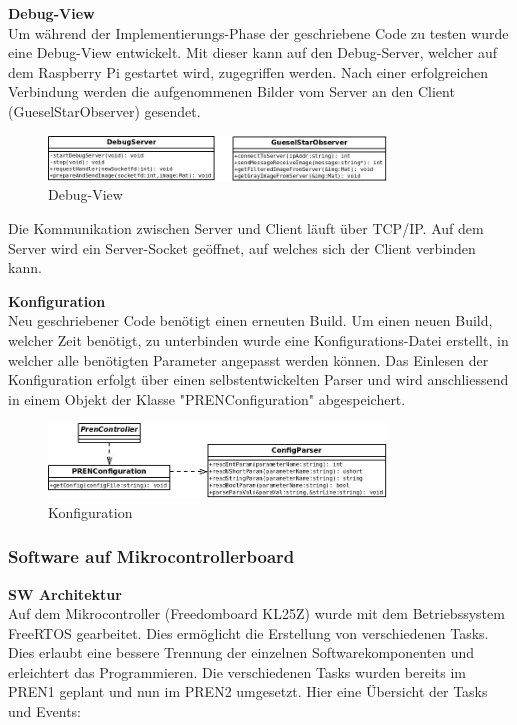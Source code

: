 \textbf{Debug-View}\\[0.2cm]
Um während der Implementierungs-Phase der geschriebene Code zu testen wurde eine Debug-View entwickelt. Mit dieser kann auf den Debug-Server, welcher auf dem Raspberry Pi gestartet wird, zugegriffen werden. Nach einer erfolgreichen Verbindung werden die aufgenommenen Bilder vom Server an den Client (GueselStarObserver) gesendet.

\begin{figure}[H]
\centering
\includegraphics[width=0.8\textwidth]{03_Loesungskonzept/pictures/DebugView.jpeg}
\caption{Debug-View}
\end{figure}

Die Kommunikation zwischen Server und Client läuft über TCP/IP. Auf dem Server wird ein Server-Socket geöffnet, auf welches sich der Client verbinden kann.

\textbf{Konfiguration}\\[0.2cm]
Neu geschriebener Code benötigt einen erneuten Build. Um einen neuen Build, welcher Zeit benötigt, zu unterbinden wurde eine Konfigurations-Datei erstellt, in welcher alle benötigten Parameter angepasst werden können. Das Einlesen der Konfiguration erfolgt über einen selbstentwickelten Parser und wird anschliessend in einem Objekt der Klasse "PRENConfiguration" abgespeichert.

\begin{figure}[H]
\centering
\includegraphics[width=0.8\textwidth]{03_Loesungskonzept/pictures/Configuration.jpeg}
\caption{Konfiguration}
\end{figure}
 
\subsubsection{Software auf Mikrocontrollerboard}

\textbf{SW Architektur}\\[0.2cm]
Auf dem Mikrocontroller (Freedomboard KL25Z) wurde mit dem Betriebssystem FreeRTOS gearbeitet. Dies ermöglicht die Erstellung von verschiedenen Tasks. Dies erlaubt eine bessere Trennung der einzelnen Softwarekomponenten und erleichtert das Programmieren. Die verschiedenen Tasks wurden bereits im PREN1 geplant und nun im PREN2 umgesetzt. 
Hier eine Übersicht der Tasks und Events:

